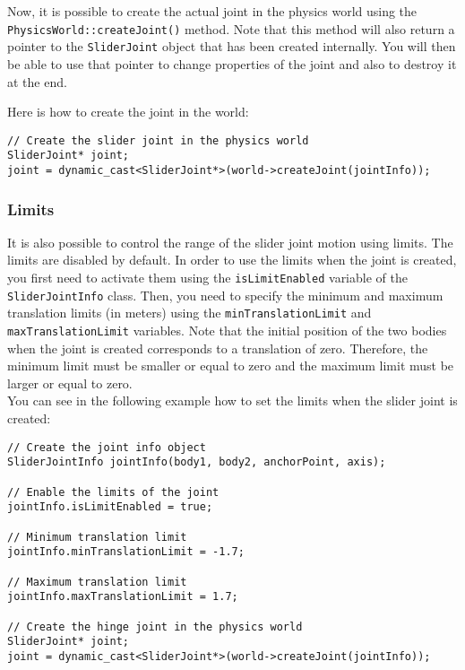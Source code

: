 \documentclass[a4paper,12pt]{article}
\begin{document}
    \vspace{0.6cm}

    \begin{sloppypar}
    Now, it is possible to create the actual joint in the physics world using the \texttt{PhysicsWorld::createJoint()} method.
    Note that this method will also return a pointer to the \texttt{SliderJoint} object that has been created internally. You will then
    be able to use that pointer to change properties of the joint and also to destroy it at the end. \\
    \end{sloppypar}

    Here is how to create the joint in the world: \\

    \begin{lstlisting}
// Create the slider joint in the physics world
SliderJoint* joint;
joint = dynamic_cast<SliderJoint*>(world->createJoint(jointInfo));
  \end{lstlisting}

    \subsubsection{Limits}

    It is also possible to control the range of the slider joint motion using limits. The limits are disabled by default. In order to use the limits when the joint is created, you first
    need to activate them using the \texttt{isLimitEnabled} variable of the \texttt{SliderJointInfo} class. Then, you need to specify the minimum and maximum translation limits
    (in meters) using the \texttt{minTranslationLimit} and \texttt{maxTranslation\-Limit} variables. Note that the initial position of the two bodies when the joint is created
    corresponds to a translation of zero. Therefore, the minimum limit must be smaller or equal to zero and the maximum limit must be larger or equal to zero. \\

    You can see in the following example how to set the limits when the slider joint is created: \\

    \begin{lstlisting}
// Create the joint info object
SliderJointInfo jointInfo(body1, body2, anchorPoint, axis);

// Enable the limits of the joint
jointInfo.isLimitEnabled = true;

// Minimum translation limit
jointInfo.minTranslationLimit = -1.7;

// Maximum translation limit
jointInfo.maxTranslationLimit = 1.7;

// Create the hinge joint in the physics world
SliderJoint* joint;
joint = dynamic_cast<SliderJoint*>(world->createJoint(jointInfo));
  \end{lstlisting}
\end{document}
